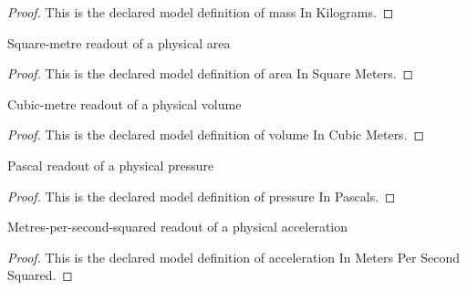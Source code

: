 \begin{proof}
  This is the declared model definition of mass In Kilograms.
\end{proof}
\begin{definition}
  \label{def:physics:phyx-mini-0333:phyxminiproblems-problemphyxmini0333-areainsquaremeters}
  Square-metre readout of a physical area
\end{definition}
\begin{proof}
  This is the declared model definition of area In Square Meters.
\end{proof}
\begin{definition}
  \label{def:physics:phyx-mini-0333:phyxminiproblems-problemphyxmini0333-volumeincubicmeters}
  Cubic-metre readout of a physical volume
\end{definition}
\begin{proof}
  This is the declared model definition of volume In Cubic Meters.
\end{proof}
\begin{definition}
  \label{def:physics:phyx-mini-0333:phyxminiproblems-problemphyxmini0333-pressureinpascals}
  Pascal readout of a physical pressure
\end{definition}
\begin{proof}
  This is the declared model definition of pressure In Pascals.
\end{proof}
\begin{definition}
  \label{def:physics:phyx-mini-0333:phyxminiproblems-problemphyxmini0333-accelerationinmeterspersecondsquared}
  Metres-per-second-squared readout of a physical acceleration
\end{definition}
\begin{proof}
  This is the declared model definition of acceleration In Meters Per Second Squared.
\end{proof}
